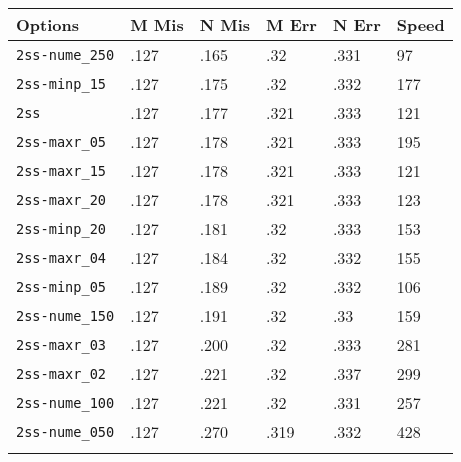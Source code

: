 \documentclass{bioinfo}
\begin{document}
\begin{table}[!t]
{
\begin{tabular}{@{}llllll@{}}
\toprule
Options & M Mis & N Mis & M Err & N Err & Speed \\
\midrule
\texttt{2ss-nume\_250}  &  .127  &  .165  &  .32   &  .331  &  97   \\
\texttt{2ss-minp\_15}   &  .127  &  .175  &  .32   &  .332  &  177  \\
\texttt{2ss}            &  .127  &  .177  &  .321  &  .333  &  121  \\
\texttt{2ss-maxr\_05}   &  .127  &  .178  &  .321  &  .333  &  195  \\
\texttt{2ss-maxr\_15}   &  .127  &  .178  &  .321  &  .333  &  121  \\
\texttt{2ss-maxr\_20}   &  .127  &  .178  &  .321  &  .333  &  123  \\
\texttt{2ss-minp\_20}   &  .127  &  .181  &  .32   &  .333  &  153  \\
\texttt{2ss-maxr\_04}   &  .127  &  .184  &  .32   &  .332  &  155  \\
\texttt{2ss-minp\_05}   &  .127  &  .189  &  .32   &  .332  &  106  \\
\texttt{2ss-nume\_150}  &  .127  &  .191  &  .32   &  .33   &  159  \\
\texttt{2ss-maxr\_03}   &  .127  &  .200  &  .32   &  .333  &  281  \\
\texttt{2ss-maxr\_02}   &  .127  &  .221  &  .32   &  .337  &  299  \\
\texttt{2ss-nume\_100}  &  .127  &  .221  &  .32   &  .331  &  257  \\
\texttt{2ss-nume\_050}  &  .127  &  .270  &  .319  &  .332  &  428  \\
\botrule
\end{tabular}
}
{}
\end{table}


\end{document}

